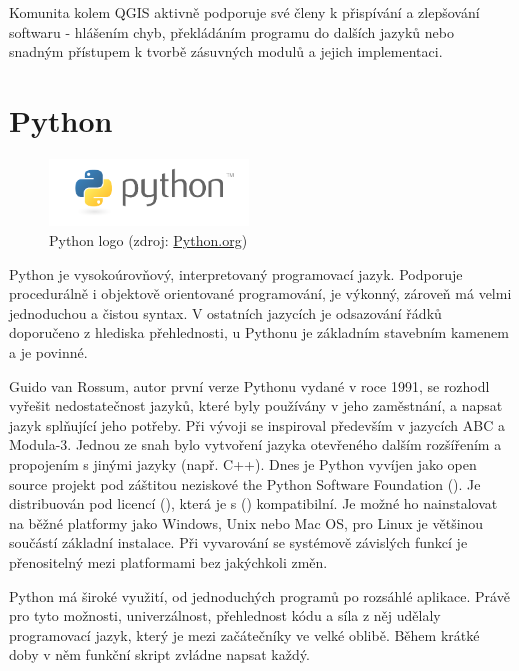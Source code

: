 Komunita kolem QGIS aktivně podporuje své členy k přispívání a
zlepšování softwaru - hlášením chyb, překládáním programu do dalších
jazyků nebo snadným přístupem k tvorbě zásuvných modulů a jejich
implementaci.


\section{Python}

\begin{figure}[H] \centering
      \includegraphics[width=150pt]{./pictures/python-logo-master-v3-TM.png}
      \caption[Python logo]{Python logo (zdroj:
\href{https://www.python.org/static/community_logos/python-logo-master-v3-TM.png}{Python.org})}
      \label{fig:python}
  \end{figure}
  
Python je vysokoúrovňový, interpretovaný programovací jazyk. Podporuje
procedurálně i objektově orientované programování, je výkonný, zároveň
má velmi jednoduchou a čistou syntax. V ostatních jazycích je
odsazování řádků doporučeno z hlediska přehlednosti, u Pythonu je
základním stavebním kamenem a je povinné.

Guido van Rossum, autor první verze Pythonu vydané v roce 1991, se
rozhodl vyřešit nedostatečnost jazyků, které byly používány v jeho
zaměstnání, a napsat jazyk splňující jeho potřeby. Při vývoji se
inspiroval především v jazycích ABC a Modula-3. Jednou ze snah bylo
vytvoření jazyka otevřeného dalším rozšířením a propojením s jinými
jazyky (např. C++). Dnes je Python vyvíjen jako open source projekt
pod záštitou neziskové the Python Software Foundation (). Je
distribuován pod licencí (), která je s ()
kompatibilní. Je možné ho nainstalovat na běžné platformy jako
Windows, Unix nebo Mac OS, pro Linux je většinou součástí základní
instalace. Při vyvarování se systémově závislých funkcí je
přenositelný mezi platformami bez jakýchkoli změn.

Python má široké využití, od jednoduchých programů po rozsáhlé
aplikace. Právě pro tyto možnosti, univerzálnost, přehlednost kódu a
síla z něj udělaly programovací jazyk, který je mezi začátečníky ve
velké oblibě. Během krátké doby v něm funkční skript zvládne napsat
každý.
  
